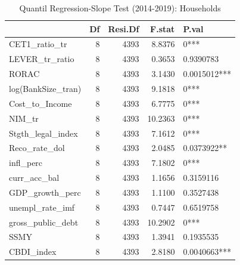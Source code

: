 \begin{table}[ht]
\centering
\caption{Quantil Regression-Slope Test (2014-2019): Households} 
\begingroup\small
\begin{tabular}{lrrrl}
  \toprule
 & Df & Resi.Df & F.stat & P.val \\ 
  \midrule
CET1\_ratio\_tr & 8 & 4393 & 8.8376 & 0*** \\ 
  LEVER\_tr\_ratio & 8 & 4393 & 0.3653 & 0.9390783 \\ 
  RORAC & 8 & 4393 & 3.1430 & 0.0015012*** \\ 
  log(BankSize\_tran) & 8 & 4393 & 9.1818 & 0*** \\ 
  Cost\_to\_Income & 8 & 4393 & 6.7775 & 0*** \\ 
  NIM\_tr & 8 & 4393 & 10.2363 & 0*** \\ 
  Stgth\_legal\_index & 8 & 4393 & 7.1612 & 0*** \\ 
  Reco\_rate\_dol & 8 & 4393 & 2.0485 & 0.0373922** \\ 
  infl\_perc & 8 & 4393 & 7.1802 & 0*** \\ 
  curr\_acc\_bal & 8 & 4393 & 1.1656 & 0.3159116 \\ 
  GDP\_growth\_perc & 8 & 4393 & 1.1100 & 0.3527438 \\ 
  unempl\_rate\_imf & 8 & 4393 & 0.7447 & 0.6519758 \\ 
  gross\_public\_debt & 8 & 4393 & 10.2902 & 0*** \\ 
  SSMY & 8 & 4393 & 1.3941 & 0.1935535 \\ 
  CBDI\_index & 8 & 4393 & 2.8180 & 0.0040663*** \\ 
   \bottomrule
\end{tabular}
\endgroup
\end{table}
